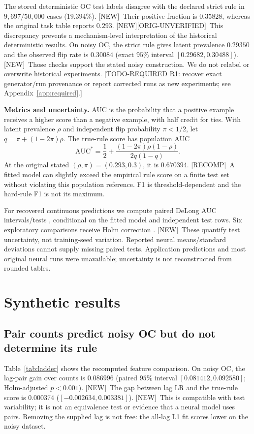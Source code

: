 \documentclass[10pt]{article}
\newcommand{\prov}[1]{{\color{black!65}\scriptsize[#1]}}
\newcommand{\ou}{\prov{ORIG-UNVERIFIED}}
\newcommand{\recomp}{\prov{RECOMP}}
\newcommand{\newres}{\prov{NEW}}
\newcommand{\req}[2]{{\color{brown!75!black}\small[TODO-REQUIRED #1: #2]}}
\newcommand{\AUC}{\mathrm{AUC}}
\begin{document}
The stored deterministic OC test labels disagree with the declared strict rule in $9{,}697/50{,}000$ cases ($19.394\%$). \newres\ Their positive fraction is $0.35828$, whereas the original task table reports $0.293$. \newres\ou\ This discrepancy prevents a mechanism-level interpretation of the historical deterministic results. On noisy OC, the strict rule gives latent prevalence $0.29350$ and the observed flip rate is $0.30084$ (exact $95\%$ interval $[0.29682,0.30488]$). \newres\ Those checks support the stated noisy construction. We do not relabel or overwrite historical experiments. \req{R1}{recover exact generator/run provenance or report corrected runs as new experiments; see Appendix~\ref{app:required}.}

\textbf{Metrics and uncertainty.} AUC is the probability that a positive example receives a higher score than a negative example, with half credit for ties. With latent prevalence $\rho$ and independent flip probability $\pi<1/2$, let $q=\pi+(1-2\pi)\rho$. The true-rule score has population AUC
\begin{equation}
\AUC^*=\frac12+\frac{(1-2\pi)\rho(1-\rho)}{2q(1-q)}.
\label{eq:auc}
\end{equation}
At the original stated $(\rho,\pi)=(0.293,0.3)$, it is $0.670394$. \recomp\ A fitted model can slightly exceed the empirical rule score on a finite test set without violating this population reference. F1 is threshold-dependent and the hard-rule F1 is not its maximum.

For recovered continuous predictions we compute paired DeLong AUC intervals/tests \citep{delong1988}, conditional on the fitted model and independent test rows. Six exploratory comparisons receive Holm correction \citep{holm1979}. \newres\ These quantify test uncertainty, not training-seed variation. Reported neural means/standard deviations cannot supply missing paired tests. Application predictions and most original neural runs were unavailable; uncertainty is not reconstructed from rounded tables.

\section{Synthetic results}
\label{sec:synthetic}
\subsection{Pair counts predict noisy OC but do not determine its rule}
Table~\ref{tab:ladder} shows the recomputed feature comparison. On noisy OC, the lag-pair gain over counts is $0.086996$ (paired $95\%$ interval $[0.081412,0.092580]$; Holm-adjusted $p<0.001$). \newres\ The gap between lag LR and the true-rule score is $0.000374$ ($[-0.002634,0.003381]$). \newres\ This is compatible with test variability; it is not an equivalence test or evidence that a neural model uses pairs. Removing the supplied lag is not free: the all-lag L1 fit scores lower on the noisy dataset.
\end{document}
